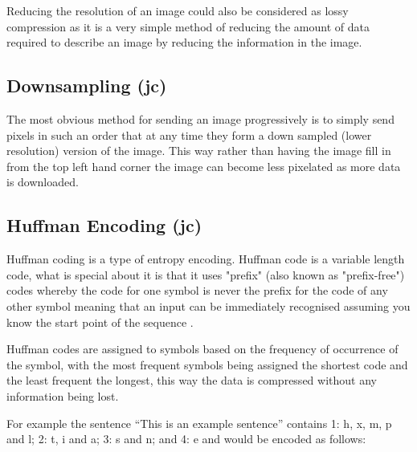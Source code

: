 Reducing the resolution of an image could also be considered as lossy compression as it is a very simple method of reducing the amount of data required to describe an image by reducing the information in the image.

\subsection{Downsampling (jc)}
\label{downsampling}

The most obvious method for sending an image progressively is to simply send pixels in such an order that at any time they form a down sampled (lower resolution) version of the image. This way rather than having the image fill in from the top left hand corner the image can become less pixelated as more data is downloaded.



\subsection{Huffman Encoding (jc)} 
\label{sec:general_huff}

Huffman coding is a type of entropy encoding. Huffman code is a variable length code, what is special about it is that it uses "prefix" (also known as "prefix-free") codes whereby the code for one symbol is never the prefix for the code of any other symbol meaning that an input can be immediately recognised assuming you know the start point of the sequence \cite{Huffman}.

Huffman codes are assigned to symbols based on the frequency of occurrence of the symbol, with the most frequent symbols being assigned the shortest code and the least frequent the longest, this way the data is compressed without any information being lost. \cite{Huffman}

For example the sentence ``This is an example sentence'' contains 1: h, x, m, p and l; 2: t, i and a; 3: s and n; and 4: e and would be encoded as follows:

